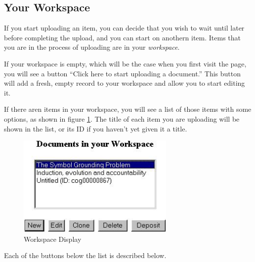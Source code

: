 \subsection{Your Workspace}

If you start uploading an item, you can decide that you wish to wait until later before completing the upload, and you can start on anothern item. Items that you are in the process of uploading are in your \emph{workspace}.

If your workspace is empty, which will be the case when you first visit the page, you will see a button ``Click here to start uploading a document.'' This button will add a fresh, empty record to your workspace and allow you to start editing it.

If there aren items in your workspace, you will see a list of those items with some options, as shown in figure \ref{workspace_shot}. The title of each item you are uploading will be shown in the list, or its ID if you haven't yet given it a title.

\begin{figure}
\centerline{\includegraphics[width=3.0in]{images/workspace-shot}}
\caption{\label{workspace_shot} Workspace Display}
\end{figure}

Each of the buttons below the list is described below.

